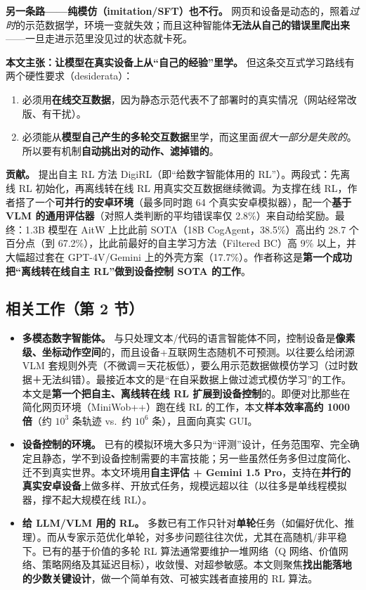 \documentclass[11pt,UTF8,fontset=fandol]{ctexart}
\begin{document}
\textbf{另一条路——纯模仿（imitation/SFT）也不行。} 网页和设备是动态的，照着\emph{过时}的示范数据学，环境一变就失效；而且这种智能体\textbf{无法从自己的错误里爬出来}——一旦走进示范里没见过的状态就卡死。

\textbf{本文主张：让模型在真实设备上从“自己的经验”里学。} 但这条交互式学习路线有两个硬性要求（desiderata）：
\begin{enumerate}[leftmargin=1.6em]
\item 必须用\textbf{在线交互数据}，因为静态示范代表不了部署时的真实情况（网站经常改版、有干扰）。
\item 必须能从\textbf{模型自己产生的多轮交互数据}里学，而这里面\emph{很大一部分是失败的}。所以要有机制\textbf{自动挑出对的动作、滤掉错的}。
\end{enumerate}

\textbf{贡献。} 提出自主 RL 方法 DigiRL（即“给数字智能体用的 RL”）。两段式：先离线 RL 初始化，再离线转在线 RL 用真实交互数据继续微调。为支撑在线 RL，作者搭了一个\textbf{可并行的安卓环境}（最多同时跑 64 个真实安卓模拟器），配一个\textbf{基于 VLM 的通用评估器}（对照人类判断的平均错误率仅 2.8\%）来自动给奖励。最终：1.3B 模型在 AitW 上比此前 SOTA（18B CogAgent，38.5\%）高出约 28.7 个百分点（到 67.2\%），比此前最好的自主学习方法（Filtered BC）高 9\% 以上，并大幅超过套在 GPT-4V/Gemini 上的外壳方案（17.7\%）。作者称这是\textbf{第一个成功把“离线转在线自主 RL”做到设备控制 SOTA 的工作}。

\subsection{相关工作（第 2 节）}
\begin{itemize}[leftmargin=1.4em]
\item \textbf{多模态数字智能体。} 与只处理文本/代码的语言智能体不同，控制设备是\textbf{像素级、坐标动作空间}的，而且设备+互联网生态随机不可预测。以往要么给闭源 VLM 套规则外壳（不微调＝天花板低），要么用示范数据做模仿学习（过时数据＋无法纠错）。最接近本文的是“在自采数据上做过滤式模仿学习”的工作。本文是\textbf{第一个把自主、离线转在线 RL 扩展到设备控制}的。即便对比那些在简化网页环境（MiniWob++）跑在线 RL 的工作，本文\textbf{样本效率高约 1000 倍}（约 $10^3$ 条轨迹 vs.\ 约 $10^6$ 条），且面向真实 GUI。
\item \textbf{设备控制的环境。} 已有的模拟环境大多只为“评测”设计，任务范围窄、完全确定且静态，学不到设备控制需要的丰富技能；另一些虽然任务多但过度简化、迁不到真实世界。本文环境用\textbf{自主评估 + Gemini 1.5 Pro}，支持在\textbf{并行的真实安卓设备}上做多样、开放式任务，规模远超以往（以往多是单线程模拟器，撑不起大规模在线 RL）。
\item \textbf{给 LLM/VLM 用的 RL。} 多数已有工作只针对\textbf{单轮}任务（如偏好优化、推理）。而从专家示范优化单轮，对多步问题往往次优，尤其在高随机/非平稳下。已有的基于价值的多轮 RL 算法通常要维护一堆网络（Q 网络、价值网络、策略网络及其延迟目标），收敛慢、对超参敏感。本文则聚焦\textbf{找出能落地的少数关键设计}，做一个简单有效、可被实践者直接用的 RL 算法。
\end{itemize}
\end{document}
